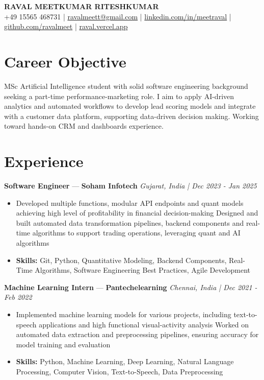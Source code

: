 \documentclass[a4paper,10pt]{article}
\begin{document}
\begin{center}
  {\Large\bfseries RAVAL MEETKUMAR RITESHKUMAR}\\[2pt]
  {\small +49 15565 468731 \;|\; \href{mailto:ravalmeett@gmail.com}{ravalmeett@gmail.com} \;|\; \href{https://www.linkedin.com/in/meetraval/}{linkedin.com/in/meetraval} \;|\; \href{https://github.com/ravalmeet}{github.com/ravalmeet} \;|\; \href{https://raval.vercel.app/}{raval.vercel.app}}
\end{center}
\vspace{-3pt}

\section*{Career Objective}
MSc Artificial Intelligence student with solid software engineering background seeking a part-time performance-marketing role. I aim to apply AI-driven analytics and automated workflows to develop lead scoring models and integrate with a customer data platform, supporting data-driven decision making. Working toward hands-on CRM and dashboards experience.\par

\section*{Experience}
\textbf{Software Engineer} — \textbf{Soham Infotech} \hfill \textit{Gujarat, India \;|\; Dec 2023 - Jan 2025}\par
\vspace{1pt}
\begin{itemize}
  \item Developed multiple functions, modular API endpoints and quant models achieving high level of profitability in financial decision-making Designed and built automated data transformation pipelines, backend components and real-time algorithms to support trading operations, leveraging quant and AI algorithms
  \item \textbf{Skills:} Git, Python, Quantitative Modeling, Backend Components, Real-Time Algorithms, Software Engineering Best Practices, Agile Development
\end{itemize}
\vspace{3pt}
\textbf{Machine Learning Intern} — \textbf{Pantechelearning} \hfill \textit{Chennai, India \;|\; Dec 2021 - Feb 2022}\par
\vspace{1pt}
\begin{itemize}
  \item Implemented machine learning models for various projects, including text-to-speech applications and high functional visual-activity analysis Worked on automated data extraction and preprocessing pipelines, ensuring accuracy for model training and evaluation
  \item \textbf{Skills:} Python, Machine Learning, Deep Learning, Natural Language Processing, Computer Vision, Text-to-Speech, Data Preprocessing
\end{itemize}
\end{document}
